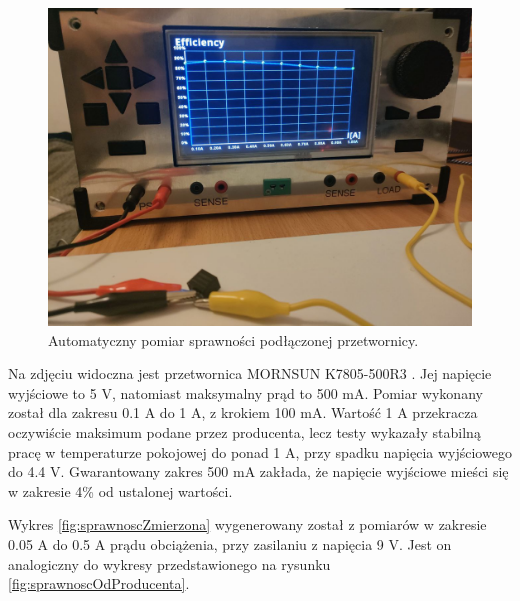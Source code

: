 \begin{figure}[h!]
    \begin{center}
        \includegraphics[width = 15cm]{images/pomiarSprawnosci.jpg}
        \caption{Automatyczny pomiar sprawności podłączonej przetwornicy.}
        \label{fig:pomiarsprawnosci}
    \end{center}
\end{figure}

Na zdjęciu widoczna jest przetwornica MORNSUN K7805-500R3 \cite{MORNSUN}. Jej napięcie wyjściowe to 5 V, natomiast maksymalny 
prąd to 500 mA. Pomiar wykonany został dla zakresu 0.1 A do 1 A, z krokiem 100 mA. Wartość 1 A przekracza oczywiście 
maksimum podane przez producenta, lecz testy wykazały stabilną pracę w temperaturze pokojowej do ponad 1 A, przy spadku 
napięcia wyjściowego do 4.4 V. Gwarantowany zakres 500 mA zakłada, że napięcie wyjściowe mieści się w zakresie 4\% od 
ustalonej wartości. 

Wykres \ref{fig:sprawnoscZmierzona} wygenerowany został z pomiarów w zakresie 0.05 A do 0.5 A prądu obciążenia, przy zasilaniu 
z napięcia 9 V.
Jest on analogiczny do wykresy przedstawionego na rysunku \ref{fig:sprawnoscOdProducenta}.

